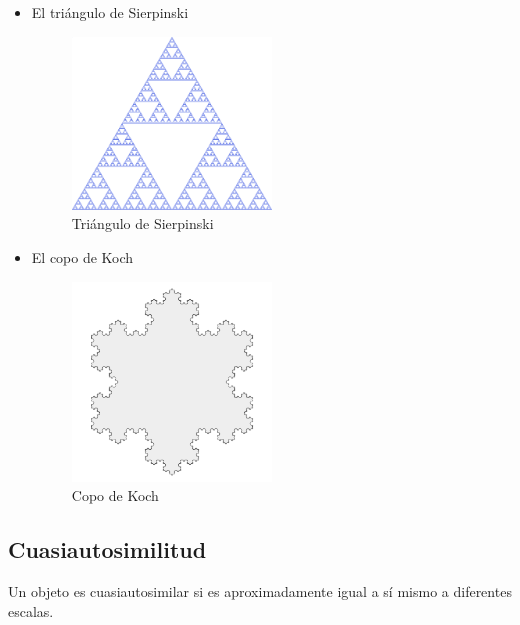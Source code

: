 \begin{itemize}
    \item El triángulo de Sierpinski
    
    \begin{figure}[H]
        \centering
        \includegraphics[width=0.5\textwidth]{figures/sierpinski-triangle.png}
        \caption{Triángulo de Sierpinski}
    \end{figure}

    \item El copo de Koch
    
    \begin{figure}[H]
        \centering
        \includegraphics[width=0.5\textwidth]{figures/koch-snowflake.png}
        \caption{Copo de Koch}
    \end{figure}

\end{itemize}

\subsection{Cuasiautosimilitud}

\begin{definition}
    Un objeto es cuasiautosimilar si es aproximadamente igual a sí mismo a diferentes escalas. \cite{Wikipedia_2023}
\end{definition}

